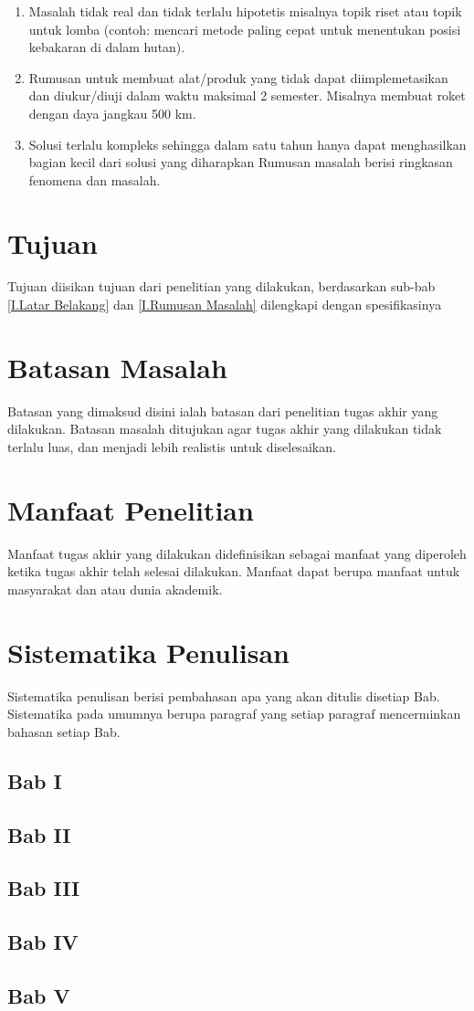 \begin{enumerate}
	\item Masalah tidak real dan tidak terlalu hipotetis misalnya topik riset atau topik untuk lomba (contoh: mencari metode paling cepat untuk menentukan posisi kebakaran di dalam hutan).
	\item Rumusan untuk membuat alat/produk yang tidak dapat diimplemetasikan dan diukur/diuji dalam waktu maksimal 2 semester. Misalnya membuat roket dengan daya jangkau 500 km.
	\item Solusi terlalu kompleks sehingga dalam satu tahun hanya dapat menghasilkan bagian kecil dari solusi yang diharapkan Rumusan masalah berisi ringkasan fenomena dan masalah.
\end{enumerate} \par


\section{Tujuan} \label{I.Tujuan}
Tujuan diisikan tujuan dari penelitian yang dilakukan, berdasarkan sub-bab \ref{I.Latar Belakang} dan \ref{I.Rumusan Masalah} dilengkapi dengan spesifikasinya \par

\section{Batasan Masalah} \label{I.Batasan}
Batasan yang dimaksud disini ialah batasan dari penelitian tugas akhir yang dilakukan. Batasan masalah ditujukan agar tugas akhir yang dilakukan tidak terlalu luas, dan menjadi lebih realistis untuk diselesaikan. \par

\section{Manfaat Penelitian} \label{I.Manfaat}
Manfaat tugas akhir yang dilakukan didefinisikan sebagai manfaat yang diperoleh ketika tugas akhir telah selesai dilakukan. Manfaat dapat berupa manfaat untuk masyarakat dan atau dunia akademik. \par

\section{Sistematika Penulisan} \label{I.Sistematika}
Sistematika penulisan berisi pembahasan apa yang akan ditulis disetiap Bab. Sistematika pada umumnya berupa paragraf yang setiap paragraf mencerminkan bahasan setiap Bab.
\subsection{Bab I}
\subsection{Bab II}
\subsection{Bab III}
\subsection{Bab IV}
\subsection{Bab V}
